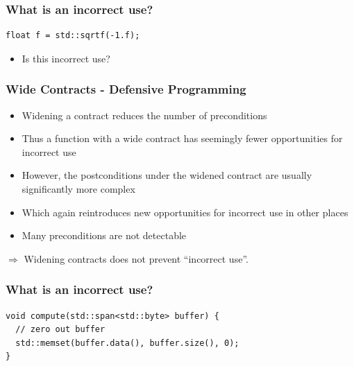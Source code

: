 \documentclass[aspectratio=169]{beamer}
\begin{document}
\begin{frame}[fragile]
  \frametitle{What is an incorrect use?}
  
  \begin{lstlisting}[style=cpp20]
float f = std::sqrtf(-1.f);
  \end{lstlisting}
  
  \vspace{20pt}
  
  \begin{itemize}
    \item Is this incorrect use?
  \end{itemize}
  
\end{frame}

\begin{frame}
  \frametitle{Wide Contracts - Defensive Programming}
  
  \begin{itemize}
    \item Widening a contract reduces the number of preconditions
    \item Thus a function with a wide contract has seemingly fewer opportunities for incorrect use
    \item However, the postconditions under the widened contract are usually significantly more complex
    \item Which again reintroduces new opportunities for incorrect use in other places
    \item Many preconditions are not detectable
  \end{itemize}
  
  \vspace{20pt}
  
  $\Rightarrow$ Widening contracts does not prevent ``incorrect use''.
\end{frame}

\begin{frame}[fragile]
  \frametitle{What is an incorrect use?}
  
  \begin{lstlisting}[style=cpp20]
void compute(std::span<std::byte> buffer) {
  // zero out buffer
  std::memset(buffer.data(), buffer.size(), 0);
}
  \end{lstlisting}
  
\end{frame}
\end{document}
